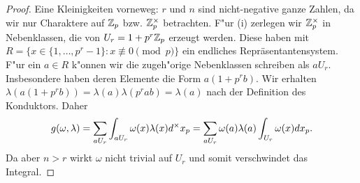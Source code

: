 	\begin{proof}
		Eine Kleinigkeiten vorneweg: $r$ und $n$ sind nicht-negative ganze Zahlen, da wir nur Charaktere auf ${\mathbb{Z}_p}$ bzw. $\mathbb{Z}_p^\times$ betrachten.
		F"ur (i) zerlegen wir $\mathbb{Z}_p^\times$ in Nebenklassen, die von $U_r=1+p^r{\mathbb{Z}_p}$ erzeugt werden.
		Diese haben mit $R=\{x \in \{ 1,\dots,p^{r}-1\}: x \not\equiv 0 \pmod{p}\}$ ein endliches Repräsentantensystem.
		F"ur ein $a \in R$ k"onnen wir die zugeh"orige Nebenklassen schreiben als $aU_r$.
		Insbesondere haben deren Elemente die Form $a(1+p^rb)$. 
		Wir erhalten $\lambda(a(1+p^rb)) = \lambda(a)\lambda(p^rab) = \lambda(a)$ nach der Definition des Konduktors.
		Daher
		\begin{align*}
			g(\omega,\lambda) = \sum_{aU_r}  \int_{aU_r} \omega(x)\lambda(x) d^\times {x}_p = \sum_{aU_r} \omega(a)\lambda(a) \int_{U_r} \omega(x)d{x}_p.
		\end{align*}
		Da aber $n>r$ wirkt $\omega$ nicht trivial auf $U_r$ und somit verschwindet das Integral.
		

\end{proof}
